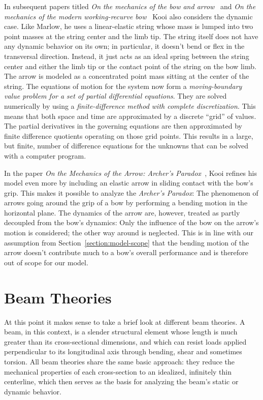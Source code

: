 In subsequent papers titled \textit{On the mechanics of the bow and arrow}~\cite{bib:kooi81} and \textit{On the mechanics of the modern working-recurve bow}~\cite{bib:kooi91} Kooi also considers the dynamic case.
Like Marlow, he uses a linear-elastic string whose mass is lumped into two point masses at the string center and the limb tip.
The string itself does not have any dynamic behavior on its own; in particular, it doesn't bend or flex in the transversal direction.
Instead, it just acts as an ideal spring between the string center and either the limb tip or the contact point of the string on the bow limb.
The arrow is modeled as a concentrated point mass sitting at the center of the string.
The equations of motion for the system now form a \textit{moving-boundary value problem for a set of partial differential equations}.
They are solved numerically by using a \textit{finite-difference method with complete discretization}.
This means that both space and time are approximated by a discrete ``grid'' of values.
The partial derivatives in the governing equations are then approximated by finite difference quotients operating on those grid points.
This results in a large, but finite, number of difference equations for the unknowns that can be solved with a computer program.

In the paper \textit{On the Mechanics of the Arrow: Archer's Paradox}~\cite{bib:kosp97}, Kooi refines his model even more by including an elastic arrow in sliding contact with the bow's grip. This makes it possible to analyze the \textit{Archer's Paradox}: The phenomenon of arrows going around the grip of a bow by performing a bending motion in the horizontal plane.
The dynamics of the arrow are, however, treated as partly decoupled from the bow's dynamics: Only the influence of the bow on the arrow's motion is considered; the other way around is neglected.
This is in line with our assumption from Section~\ref{section:model-scope} that the bending motion of the arrow doesn't contribute much to a bow's overall performance and is therefore out of scope for our model.

\newpage
\section{Beam Theories}

At this point it makes sense to take a brief look at different beam theories.
A beam, in this context, is a slender structural element whose length is much greater than its cross-sectional dimensions, and which can resist loads applied perpendicular to its longitudinal axis through bending, shear and sometimes torsion.
All beam theories share the same basic approach: they reduce the mechanical properties of each cross-section to an idealized, infinitely thin centerline, which then serves as the basis for analyzing the beam's static or dynamic behavior.

